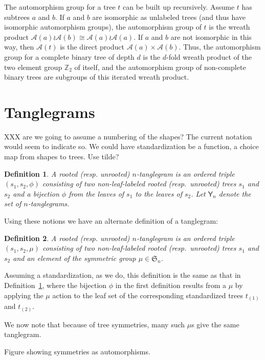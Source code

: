\documentclass{amsart}
\newtheorem{definition}{Definition}
\newcommand{\ZZ}{\mathbb Z}
\newcommand{\fS}{\mathfrak S}
\newcommand{\aut}{\mathcal A}
\newcommand{\pairing}{\mu}
\newcommand{\tangle}{\mathsf{Y}}
\begin{document}
The automorphism group for a tree $t$ can be built up recursively.
Assume $t$ has subtrees $a$ and $b$.
If $a$ and $b$ are isomorphic as unlabeled trees (and thus have isomorphic automorphism groups), the automorphism group of $t$ is the wreath product $\aut(a) \wr \aut(b) \cong \aut(a) \wr \aut(a)$.
If $a$ and $b$ are not isomorphic in this way, then $\aut(t)$ is the direct product $\aut(a) \times \aut(b)$.
Thus, the automorphism group for a complete binary tree of depth $d$ is the $d$-fold wreath product of the two element group $\ZZ_2$ of itself, and the automorphism group of non-complete binary trees are subgroups of this iterated wreath product.


\section{Tanglegrams}

XXX are we going to assume a numbering of the shapes? The current notation would seem to indicate so.
We could have standardization be a function, a choice map from shapes to trees.
Use tilde?

\begin{definition}
\label{def:abstractTanglegram}
A rooted (resp. unrooted) $n$-\emph{tanglegram} is an ordered triple $(s_1, s_2, \phi)$ consisting of two non-leaf-labeled rooted (resp.\ unrooted) trees $s_1$ and $s_2$ and a bijection $\phi$ from the leaves of $s_1$ to the leaves of $s_2$.
Let $\tangle_n$ denote the set of $n$-tanglegrams.
\end{definition}

Using these notions we have an alternate definition of a tanglegram:
\begin{definition}
\label{def:tanglegram}
A rooted (resp. unrooted) $n$-\emph{tanglegram} is an ordered triple $(s_1, s_2, \pairing)$ consisting of two non-leaf-labeled rooted (resp.\ unrooted) trees $s_1$ and $s_2$ and an element of the symmetric group $\pairing \in \fS_n$.
\end{definition}
Assuming a standardization, as we do, this definition is the same as that in Definition~\ref{def:abstractTanglegram}, where the bijection $\phi$ in the first definition results from a $\pairing$ by applying the $\pairing$ action to the leaf set of the corresponding standardized trees $t_{(1)}$ and $t_{(2)}$.

We now note that because of tree symmetries, many such $\pairing$s give the same tanglegram.

Figure showing symmetries as automorphisms.
\end{document}
